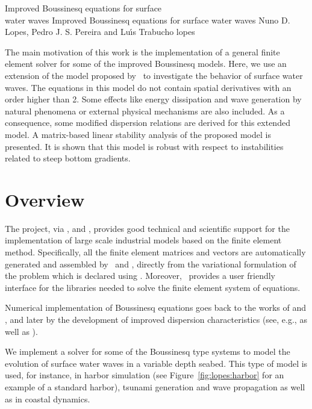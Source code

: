               {Improved Boussinesq equations for surface \\ water waves}
              {Improved Boussinesq equations for surface water waves}
              {Nuno D. Lopes, Pedro J. S. Pereira and Lu{\'\i}s Trabucho}
              {lopes}

The main motivation of this work is the implementation of a general
finite element solver for some of the improved Boussinesq
models. Here, we use an extension of the
model proposed by~\citet{ZhaoTengCheng2004} to investigate the
behavior of surface water waves. The equations in this model do not
contain spatial derivatives with an order higher than 2. Some effects
like energy dissipation and wave generation by natural phenomena or
external physical mechanisms are also included.  As a consequence,
some modified dispersion relations are derived for this extended
model. A matrix-based linear stability analysis of the proposed model
is presented.  It is shown that this model is robust with respect to
instabilities related to steep bottom gradients.

\section{Overview}

The \fenics project, via \dolfin, \ufl and \ffc, provides good
technical and scientific support for the implementation of large scale
industrial models based on the finite element method. Specifically,
all the finite element matrices and vectors are automatically
generated and assembled by \dolfin\ and \ffc, directly from the
variational formulation of the problem which is declared using
\ufl. Moreover, \dolfin\ provides a user friendly interface for the
libraries needed to solve the finite element system of equations.

Numerical implementation of Boussinesq equations goes back to the
works of \citet{Peregrine1967} and \citet{Wu1981}, and later by the
development of improved dispersion characteristics (see, e.g.,
\citet{MadsenEtAl1991,Nwogu1993,ChenLiu1994} as well as
\citet{BejiNadaoka1996}).

We implement a solver for some of the Boussinesq type systems to model
the evolution of surface water waves in a variable
depth seabed.  This type of model is used, for instance, in harbor
simulation (see Figure~\ref{fig:lopes:harbor} for an example of a
standard harbor), tsunami generation and wave propagation as well as
in coastal dynamics.

